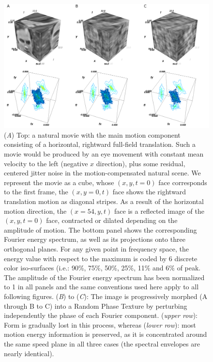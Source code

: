 \documentclass[a4paper,11pt]{article}%
\begin{document}
\begin{figure}%
	\includegraphics[width=\textwidth]{figure1}%
	\caption{(\textit{A}) Top: a natural movie with the main motion component consisting of a horizontal, rightward full-field translation. Such a movie would be produced by an eye movement with constant mean velocity to the left (negative $x$ direction), plus some residual, centered jitter noise in the motion-compensated natural scene. We represent the movie as a cube, whose $(x,y,t=0)$ face corresponds to the first frame, the $(x,y=0,t)$ face shows the rightward translation motion as diagonal stripes. As a result of the horizontal motion direction, the $(x=54,y,t)$ face is a reflected image of the $(x,y,t=0)$ face, contracted or dilated depending on the amplitude of motion. The bottom panel shows the corresponding Fourier energy spectrum, as well as its projections onto three orthogonal planes. For any given point in frequency space, the energy value with respect to the maximum is coded by 6 discrete color iso-surfaces (i.e.: 90\%, 75\%, 50\%, 25\%, 11\% and 6\% of peak. The amplitude of the Fourier energy spectrum has been normalized to 1 in all panels and the same conventions used here apply to all following figures. (\textit{B}) to (\textit{C}): The image is progressively morphed (A through B to C) into a Random Phase Texture by perturbing independently the phase of each Fourier component.  (\textit{upper row}): Form is gradually lost in this process, whereas (\textit{lower row}): most motion energy information is preserved, as it is concentrated around the same speed plane in all three cases (the spectral envelopes are nearly identical).}%
	 \label{fig:morphing}%
\end{figure}%
\end{document}
